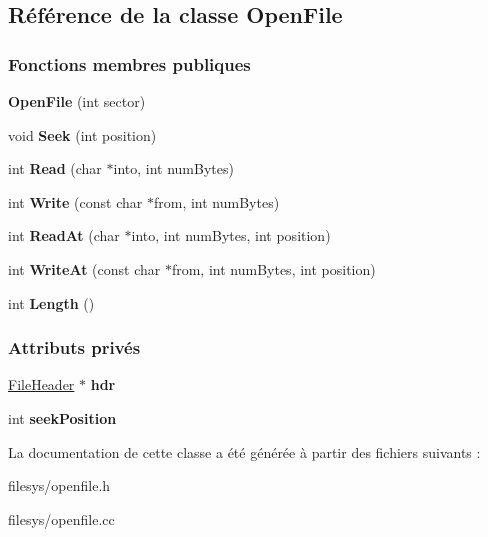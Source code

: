 \hypertarget{class_open_file}{}\subsection{Référence de la classe Open\+File}
\label{class_open_file}
\subsubsection*{Fonctions membres publiques}
\begin{DoxyCompactItemize}
\item 
\hypertarget{class_open_file_a89136ac6b54013a413398f9496d39963}{}\label{class_open_file_a89136ac6b54013a413398f9496d39963} 
{\bfseries Open\+File} (int sector)
\item 
\hypertarget{class_open_file_a00f20ca65c80be4e6039a9f04cb03374}{}\label{class_open_file_a00f20ca65c80be4e6039a9f04cb03374} 
void {\bfseries Seek} (int position)
\item 
\hypertarget{class_open_file_af87bf2b0b15fa3501dada45a1a284bf4}{}\label{class_open_file_af87bf2b0b15fa3501dada45a1a284bf4} 
int {\bfseries Read} (char $\ast$into, int num\+Bytes)
\item 
\hypertarget{class_open_file_a87c9a57b565f2503d59a1e32f68163c9}{}\label{class_open_file_a87c9a57b565f2503d59a1e32f68163c9} 
int {\bfseries Write} (const char $\ast$from, int num\+Bytes)
\item 
\hypertarget{class_open_file_a0af8cd52ec71a2ad407039cebee2ef3d}{}\label{class_open_file_a0af8cd52ec71a2ad407039cebee2ef3d} 
int {\bfseries Read\+At} (char $\ast$into, int num\+Bytes, int position)
\item 
\hypertarget{class_open_file_afdafc019e4fa166c44e8f7d4f820166f}{}\label{class_open_file_afdafc019e4fa166c44e8f7d4f820166f} 
int {\bfseries Write\+At} (const char $\ast$from, int num\+Bytes, int position)
\item 
\hypertarget{class_open_file_a5d5618da2388829f294c3f33017fadac}{}\label{class_open_file_a5d5618da2388829f294c3f33017fadac} 
int {\bfseries Length} ()
\end{DoxyCompactItemize}
\subsubsection*{Attributs privés}
\begin{DoxyCompactItemize}
\item 
\hypertarget{class_open_file_a4aaa8d3ea50b339ebd9e9c4d9cc1ff9e}{}\label{class_open_file_a4aaa8d3ea50b339ebd9e9c4d9cc1ff9e} 
\hyperlink{class_file_header}{File\+Header} $\ast$ {\bfseries hdr}
\item 
\hypertarget{class_open_file_ae73fc3708c50308938c44a9cc65ff8e2}{}\label{class_open_file_ae73fc3708c50308938c44a9cc65ff8e2} 
int {\bfseries seek\+Position}
\end{DoxyCompactItemize}


La documentation de cette classe a été générée à partir des fichiers suivants \+:\begin{DoxyCompactItemize}
\item 
filesys/openfile.\+h\item 
filesys/openfile.\+cc\end{DoxyCompactItemize}
